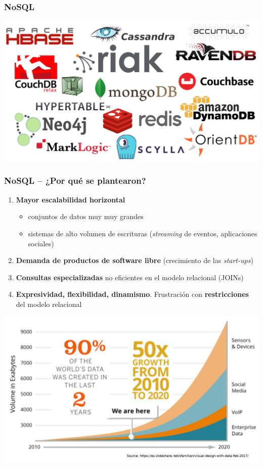 \documentclass[14pt]{beamer}
\newcommand{\ra}{{\color{blue} $\Rightarrow${}~{}}}
\begin{document}
\begin{frame}
  \frametitle{NoSQL}
\centering\includegraphics[width=\textwidth]{img/nosqldatabases}
\end{frame}

\begin{frame}[allowframebreaks]
  \frametitle{NoSQL -- ¿Por qué se plantearon?}
\begin{enumerate}
\item {\bf Mayor escalabilidad horizontal}
  \begin{itemize}
  \item conjuntos de datos muy muy grandes
  \item sistemas de alto volumen de escrituras ({\em streaming\/} de
    eventos, aplicaciones sociales)
  \end{itemize}
\item {\bf Demanda de productos de software libre} (crecimiento de las {\em
    start-ups})
\item {\bf Consultas especializadas} no eficientes en el modelo relacional
  (JOINs)
\item {\bf Expresividad, flexibilidad, dinamismo}. Frustración con {\bf
    restricciones} del modelo relacional
\end{enumerate}

\framebreak

\includegraphics[width=\textwidth]{img/data-growth}

\end{frame}
\end{document}
